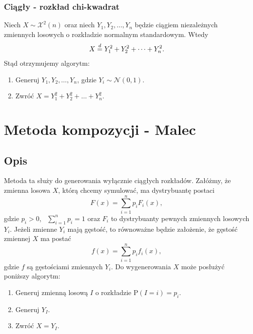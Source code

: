 \documentclass[12pt]{mwrep}
\begin{document}
	\subsubsection{Ciągły - rozkład chi-kwadrat}
	\noindent Niech $ X \sim \mathcal{X}^2(n) $ oraz niech $Y_1, Y_2, \dots, Y_n$ będzie ciągiem niezależnych zmiennych losowych o rozkładzie normalnym standardowym. Wtedy
	$$ X \buildrel{d} \over{=} Y_1^2 + Y_2^2 + \dots + Y_n^2. $$
	Stąd otrzymujemy algorytm:
	\begin{enumerate}[leftmargin=10mm]
		\item Generuj $ Y_1, Y_2, \dots, Y_n $, gdzie $Y_i \sim \mathcal{N}(0, 1) $.
		\item Zwróć $ X = Y_1^2 + Y_2^2 + \dots + Y_n^2 $.
	\end{enumerate}
	
	
	
	
	
	\section{Metoda kompozycji - Malec}
	
	\subsection{Opis}
	\noindent Metoda ta służy do generowania wyłącznie ciągłych rozkładów. Załóżmy, że zmienna losowa $X$, którą chcemy symulować, ma dystrybuantę postaci
	$$ F(x) = \sum_{i=1}^n p_i F_i(x), $$
	gdzie $p_i > 0$, \ $\sum\limits_{i=1}^n p_i = 1$ oraz $F_i$ to dystrybuanty pewnych zmiennych losowych $Y_i$. Jeżeli zmienne $Y_i$ mają gęstość, to równoważne będzie założenie, że gęstość zmiennej $X$ ma postać
	$$ f(x) = \sum_{i=1}^n p_i f_i(x), $$
	gdzie $f$ są gęstościami zmiennych $Y_i$. Do wygenerowania $X$ może posłużyć poniższy algorytm:
	\begin{enumerate}[leftmargin=10mm]
		\item Generuj zmienną losową $I$ o rozkładzie $\mathrm{P}(I = i) = p_i$.
		\item Generuj $Y_I$.
		\item Zwróć $X = Y_I$.
	\end{enumerate}
\end{document}
